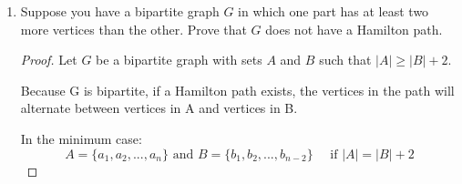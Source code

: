 \documentclass[11pt, letterpaper, includehead]{article}
\theoremstyle{plain}
\theoremstyle{mydefinition}
\theoremstyle{myproperty}
\begin{document}
\begin{enumerate}[label=\textbf{\arabic*}., leftmargin=*]
\begin{enumerate}[label=(\alph*)]
        \begin{proof} By contradiction
           
            Assume the graph contains a Hamilton cycle.
            
            A Hamilton cycle visits every vertex exactly once, beginning and ending at the same vertex. 

            For a bipartite graph, this implies the Hamilton cycle must alternate between vertices in set $A$ and $B$, as no vertices in the same set are adjacent.

            For the given graph $|A| = |B|+ 1$.

            \underline{Case 1:} Start at a vertex in set A
       
            The cycle can then be described as:
            \[(a_1, b_1, a_2, b_2,..., a_{n - 1}, b_{n - 1}, a_n, a_1) \quad \text{ s.t. } a \in A \text{ and } b \in B\]

            But $a_1, a_n \in A$ and thus cannot be adjacent which is a contradiction.

            \underline{Case 2:} Start at a vertex in set B
            
            The cycle can then be described as:
            \[(b_1, a_1, b_2, a_2,..., b_{n - 1}, a_{n - 1}, a_n, b_1) \quad \text{ s.t. } a \in A \text{ and } b \in B\]
           
            Note vertex $b_n$ does not exist as $|A| = |B|+ 1$. $a_{n-1}, a_n \in A$ and thus cannot be adjacent which is a contradiction.

            Therefore by contradiction there cannot exist a Hamilton cycle.  
            
        \end{proof}

        
        \item Suppose you have a bipartite graph $G$ in which one part has at least two more vertices than the other. Prove that $G$ does not have a Hamilton path.

        \begin{proof}
            Let $G$ be a bipartite graph with sets $A$ and $B$ such that $|A| \ge |B| + 2$.
            
            Because G is bipartite, if a Hamilton path exists, the vertices in the path will alternate between vertices in A and vertices in B.

            In the minimum case: 
            \[A = \{a_1, a_2, ... , a_n\} \text{ and } B = \{b_1, b_2, ..., b_{n - 2}\} \quad \text{ if } |A| = |B| + 2\]


\end{proof}
\end{enumerate}
\end{enumerate}
\end{document}
